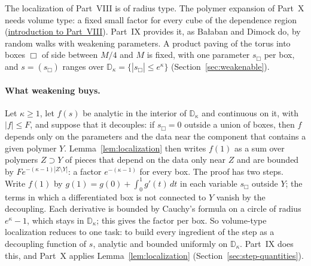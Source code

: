 \label{intro:IX}
The localization of Part~VIII is of radius type. The polymer expansion of Part~X needs volume type: a fixed small factor for every cube of the dependence region (\hyperref[intro:VIII]{introduction to Part~VIII}). Part~IX provides it, as Ba\l aban and Dimock do, by random walks with weakening parameters. A product paving of the torus into boxes $\Box$ of side between $M/4$ and $M$ is fixed, with one parameter $s_\Box$ per box, and $s=(s_\Box)$ ranges over $\mathbb D_\kappa=\{|s_\Box|\le e^\kappa\}$ (Section~\ref{sec:weakenable}).

\paragraph{What weakening buys.} Let $\kappa\ge1$, let $f(s)$ be analytic in the interior of $\mathbb D_\kappa$ and continuous on it, with $|f|\le F$, and suppose that it decouples: if $s_\Box=0$ outside a union of boxes, then $f$ depends only on the parameters and the data near the component that contains a given polymer $Y$. Lemma~\ref{lem:localization} then writes $f(1)$ as a sum over polymers $Z\supset Y$ of pieces that depend on the data only near $Z$ and are bounded by $Fe^{-(\kappa-1)|Z\setminus Y|}$: a factor $e^{-(\kappa-1)}$ for every box. The proof has two steps. Write $f(1)$ by $g(1)=g(0)+\int_0^1g'(t)\,dt$ in each variable $s_\Box$ outside $Y$; the terms in which a differentiated box is not connected to $Y$ vanish by the decoupling. Each derivative is bounded by Cauchy's formula on a circle of radius $e^\kappa-1$, which stays in $\mathbb D_\kappa$; this gives the factor per box. So volume-type localization reduces to one task: to build every ingredient of the step as a decoupling function of $s$, analytic and bounded uniformly on $\mathbb D_\kappa$. Part~IX does this, and Part~X applies Lemma~\ref{lem:localization} (Section~\ref{sec:step-quantities}).

